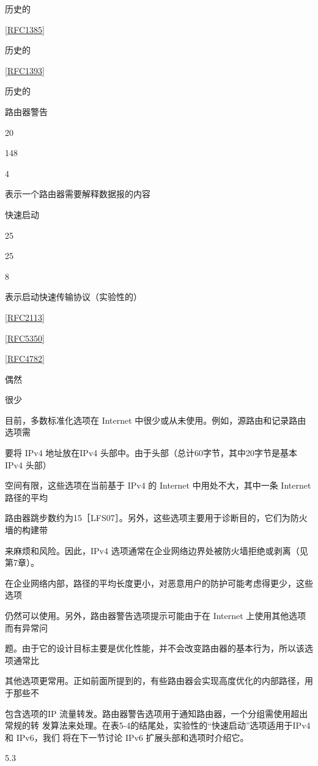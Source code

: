 历史的

\href{https://www.rfc-editor.org/rfc/rfc1385}{[RFC1385]}

历史的

\href{https://www.rfc-editor.org/rfc/rfc1393}{[RFC1393]}

历史的

路由器警告

20

148

4

表示一个路由器需要解释数据报的内容

快速启动

25

25

8

表示启动快速传输协议（实验性的）

\href{https://www.rfc-editor.org/rfc/rfc2113}{[RFC2113]}

\href{https://www.rfc-editor.org/rfc/rfc5350}{[RFC5350]}

\href{https://www.rfc-editor.org/rfc/rfc4782}{[RFC4782]}

偶然

很少

目前，多数标准化选项在 Internet 中很少或从未使用。例如，源路由和记录路由选项需

要将 IPv4 地址放在IPv4 头部中。由于头部（总计60字节，其中20字节是基本IPv4 头部）

空间有限，这些选项在当前基于 IPv4 的 Internet 中用处不大，其中一条 Internet 路径的平均

路由器跳步数约为15［LFS07］。另外，这些选项主要用于诊断目的，它们为防火墻的构建带

来麻烦和风险。因此，IPv4 选项通常在企业网络边界处被防火墙拒绝或剥离（见第7章）。

在企业网络内部，路径的平均长度更小，对恶意用户的防护可能考虑得更少，这些选项

仍然可以使用。另外，路由器警告选项提示可能由于在 Internet 上使用其他选项而有异常问

题。由于它的设计目标主要是优化性能，并不会改变路由器的基本行为，所以该选项通常比

其他选项更常用。正如前面所提到的，有些路由器会实现高度优化的内部路径，用于那些不

包含选项的IP 流量转发。路由器警告选项用于通知路由器，一个分组需使用超出常规的转
发算法来处理。在表5-4的结尾处，实验性的“快速启动”选项适用于IPv4 和 IPv6，我们
将在下一节讨论 IPv6 扩展头部和选项时介绍它。

5.3

